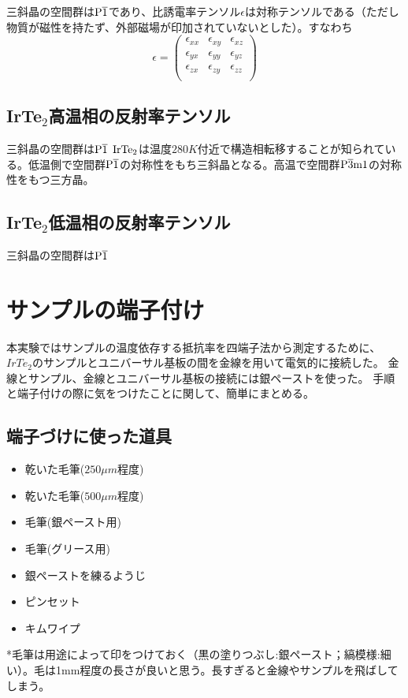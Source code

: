 \documentclass[11pt,a4paper]{jsarticle}
\begin{document}
三斜晶の空間群は$\rm P\overline{1}$であり、比誘電率テンソル$\epsilon$は対称テンソルである（ただし物質が磁性を持たず、外部磁場が印加されていないとした）。すなわち
\[
  \epsilon = \left(
    \begin{array}{ccc}
      \epsilon_{xx} & \epsilon_{xy} & \epsilon_{xz} \\
      \epsilon_{yx} & \epsilon_{yy} & \epsilon_{yz} \\
      \epsilon_{zx} & \epsilon_{zy} & \epsilon_{zz} \\
    \end{array}
  \right)
\]


\subsection{IrTe$_2$高温相の反射率テンソル}
三斜晶の空間群は$\rm P\overline{1}$
$\rm IrTe_2$は温度$280K$付近で構造相転移することが知られている。低温側で空間群$\rm P\overline{1}$の対称性をもち三斜晶となる。高温で空間群$\rm P\overline{3}m1$の対称性をもつ三方晶\cite{space_group_IrTe2}。

\subsection{IrTe$_2$低温相の反射率テンソル}
三斜晶の空間群は$\rm P\overline{1}$


\section{サンプルの端子付け}
\label{sec:4terminal}
本実験ではサンプルの温度依存する抵抗率を四端子法から測定するために、$IrTe_2$のサンプルとユニバーサル基板の間を金線を用いて電気的に接続した。
金線とサンプル、金線とユニバーサル基板の接続には銀ペーストを使った。
手順と端子付けの際に気をつけたことに関して、簡単にまとめる。

\subsection{端子づけに使った道具}

\begin{itemize}
\item 乾いた毛筆($250\mu m$程度)
\item 乾いた毛筆($500\mu m$程度)
\item 毛筆(銀ペースト用)
\item 毛筆(グリース用)
\item 銀ペーストを練るようじ
\item ピンセット
\item キムワイプ
\end{itemize}
*毛筆は用途によって印をつけておく（黒の塗りつぶし:銀ペースト；縞模様:細い）。毛は1mm程度の長さが良いと思う。長すぎると金線やサンプルを飛ばしてしまう。
\end{document}

